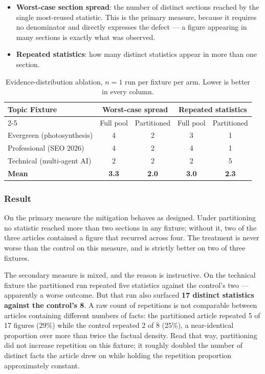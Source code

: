 \begin{itemize}
    \item \textbf{Worst-case section spread}: the number of distinct sections
      reached by the single most-reused statistic. This is the primary measure,
      because it requires no denominator and directly expresses the defect --- a
      figure appearing in many sections is exactly what was observed.
    \item \textbf{Repeated statistics}: how many distinct statistics appear in
      more than one section.
\end{itemize}

\begin{table}[ht]
    \centering
    \renewcommand{\arraystretch}{1.3}
    \begin{tabular}{|l|c|c|c|c|}
        \hline
        \textbf{Topic Fixture} & \multicolumn{2}{c|}{\textbf{Worst-case spread}} &
        \multicolumn{2}{c|}{\textbf{Repeated statistics}} \\
        \cline{2-5}
         & Full pool & Partitioned & Full pool & Partitioned \\
        \hline
        Evergreen (photosynthesis) & 4 & 2 & 3 & 1 \\
        \hline
        Professional (SEO 2026) & 4 & 2 & 4 & 1 \\
        \hline
        Technical (multi-agent AI) & 2 & 2 & 2 & 5 \\
        \hline
        \textbf{Mean} & \textbf{3.3} & \textbf{2.0} & \textbf{3.0} & \textbf{2.3} \\
        \hline
    \end{tabular}
    \caption{Evidence-distribution ablation, $n=1$ run per fixture per arm.
             Lower is better in every column.}
    \label{tab:ablation}
\end{table}

\subsubsection{Result}
On the primary measure the mitigation behaves as designed. Under partitioning
no statistic reached more than two sections in any fixture; without it, two of
the three articles contained a figure that recurred across four. The treatment
is never worse than the control on this measure, and is strictly better on two
of three fixtures.

The secondary measure is mixed, and the reason is instructive. On the technical
fixture the partitioned run repeated five statistics against the control's two
--- apparently a worse outcome. But that run also surfaced \textbf{17 distinct
statistics against the control's 8}. A raw count of repetitions is not
comparable between articles containing different numbers of facts: the
partitioned article repeated 5 of 17 figures (29\%) while the control repeated 2
of 8 (25\%), a near-identical proportion over more than twice the factual
density. Read that way, partitioning did not increase repetition on this
fixture; it roughly doubled the number of distinct facts the article drew on
while holding the repetition proportion approximately constant.

